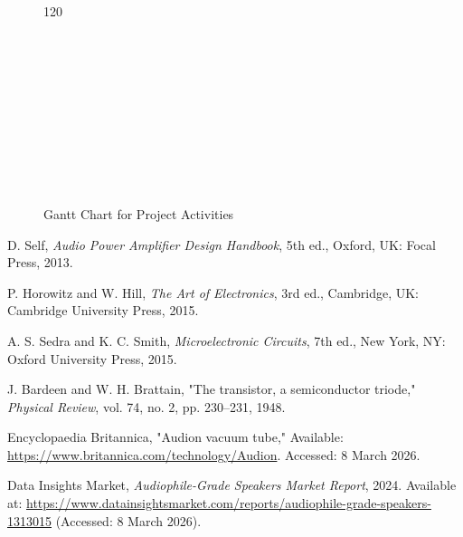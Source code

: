 \documentclass[12pt,a4paper]{report}
\begin{document}
	\begin{landscape}
		\begin{figure}[H]
			\centering
			\caption{Gantt Chart for Project Activities}
			\label{fig:gantt}
			
			\begin{ganttchart}[
				x unit=0.9cm,
				y unit chart=0.7cm,
				vgrid,
				hgrid,
				title height=1,
				title label font=\footnotesize\bfseries,
				bar label font=\footnotesize,
				bar/.append style={fill=gray!50},
				group/.append style={fill=gray!30}
				]{1}{20}
				
				 \\
				
				 \\
				 \\
				 \\
				 \\
				 \\
				 \\
				 \\
				 \\
				
			\end{ganttchart}
		\end{figure}
	\end{landscape}
	
	\begin{thebibliography}{9}
		
		D. Self,
		\textit{Audio Power Amplifier Design Handbook},
		5th ed.,
		Oxford, UK: Focal Press, 2013.
		
		P. Horowitz and W. Hill,
		\textit{The Art of Electronics},
		3rd ed.,
		Cambridge, UK: Cambridge University Press, 2015.
		
		A. S. Sedra and K. C. Smith,
		\textit{Microelectronic Circuits},
		7th ed.,
		New York, NY: Oxford University Press, 2015.
		
		J. Bardeen and W. H. Brattain,
		"The transistor, a semiconductor triode,"
		\textit{Physical Review},
		vol. 74, no. 2, pp. 230--231, 1948.
		
		Encyclopaedia Britannica,
		"Audion vacuum tube,"
		Available: \url{https://www.britannica.com/technology/Audion}.
		Accessed: 8 March 2026.
		
		Data Insights Market,
		\textit{Audiophile-Grade Speakers Market Report},
		2024. Available at:
		\url{https://www.datainsightsmarket.com/reports/audiophile-grade-speakers-1313015}
		(Accessed: 8 March 2026).
		
	\end{thebibliography}
	
\end{document}
